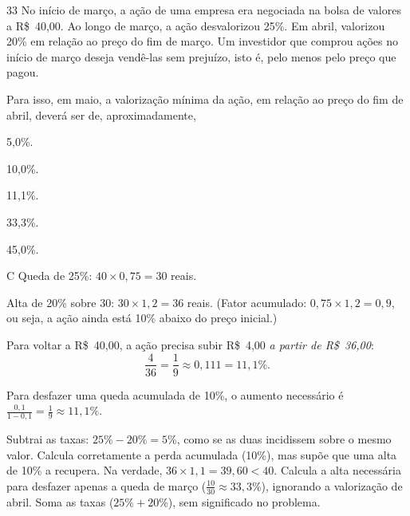 \begin{questaoinedita}{3}{3}
No início de março, a ação de uma empresa era negociada na bolsa de valores a
R\$~40,00. Ao longo de março, a ação desvalorizou 25\%. Em abril, valorizou
20\% em relação ao preço do fim de março. Um investidor que comprou ações no
início de março deseja vendê-las sem prejuízo, isto é, pelo menos pelo preço
que pagou.

Para isso, em maio, a valorização mínima da ação, em relação ao preço do fim de
abril, deverá ser de, aproximadamente,
\begin{alternativas*}[5]
  \item 5,0\%.
  \item 10,0\%.
  \item 11,1\%.
  \item 33,3\%.
  \item 45,0\%.
\end{alternativas*}
\end{questaoinedita}
\begin{resolucao}{C}
 Queda de 25\%: $40\times 0{,}75 = 30$ reais.

 Alta de 20\% sobre 30: $30\times 1{,}2 = 36$ reais.
(Fator acumulado: $0{,}75\times 1{,}2 = 0{,}9$, ou seja, a ação ainda está 10\%
abaixo do preço inicial.)

 Para voltar a R\$~40,00, a ação precisa subir
R\$~4,00 \emph{a partir de R\$~36,00}:
\[ \frac{4}{36} = \frac{1}{9}\approx 0{,}111 = 11{,}1\%. \]

 Para desfazer uma queda acumulada de 10\%, o aumento
necessário é $\frac{0{,}1}{1-0{,}1} = \frac{1}{9}\approx 11{,}1\%$.

\begin{distratores}
 Subtrai as taxas: $25\% - 20\% = 5\%$, como se as duas incidissem sobre
o mesmo valor.
 Calcula corretamente a perda acumulada (10\%), mas supõe que uma alta de
10\% a recupera. Na verdade, $36\times 1{,}1 = 39{,}60 < 40$.
 Calcula a alta necessária para desfazer apenas a queda de março
($\frac{10}{30}\approx 33{,}3\%$), ignorando a valorização de abril.
 Soma as taxas ($25\% + 20\%$), sem significado no problema.
\end{distratores}
\end{resolucao}

